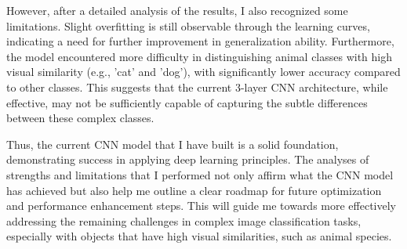 \documentclass[12pt, a4paper, openany]{report}
\begin{document}
 However, after a detailed analysis of the results, I also recognized some limitations. Slight overfitting is still observable through the learning curves, indicating a need for further improvement in generalization ability. Furthermore, the model encountered more difficulty in distinguishing animal classes with high visual similarity (e.g., 'cat' and 'dog'), with significantly lower accuracy compared to other classes. This suggests that the current 3-layer CNN architecture, while effective, may not be sufficiently capable of capturing the subtle differences between these complex classes.

 Thus, the current CNN model that I have built is a solid foundation, demonstrating success in applying deep learning principles. The analyses of strengths and limitations that I performed not only affirm what the CNN model has achieved but also help me outline a clear roadmap for future optimization and performance enhancement steps. This will guide me towards more effectively addressing the remaining challenges in complex image classification tasks, especially with objects that have high visual similarities, such as animal species.

 
\end{document}
